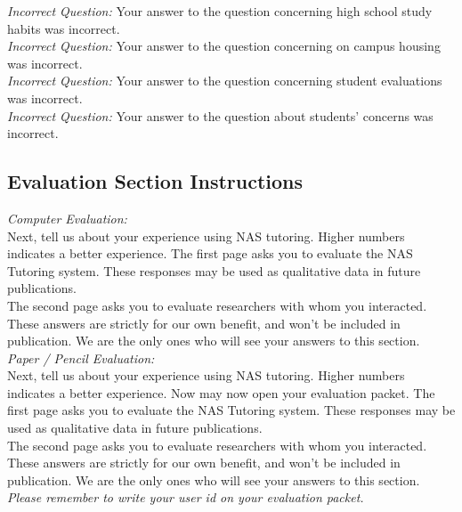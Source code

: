 \documentclass{sig-alternate-05-2015}
\begin{document}
{\noindent \emph{Incorrect Question:} Your answer to the question concerning high school study habits was incorrect.\\

\noindent \emph{Incorrect Question:} Your answer to the question concerning on campus housing was incorrect.\\

\noindent \emph{Incorrect Question:} Your answer to the question concerning student evaluations was incorrect.\\

\noindent \emph{Incorrect Question:} Your answer to the question about students' concerns was incorrect.\\


\subsection{Evaluation Section Instructions}

\noindent \emph{Computer Evaluation:}\\
\noindent Next, tell us about your experience using NAS tutoring. Higher numbers indicates a better experience. The first page asks you to evaluate the NAS Tutoring system. These responses may be used as qualitative data in future publications.\\

\noindent The second page asks you to evaluate researchers with whom you interacted. These answers are strictly for our own benefit, and won't be included in publication. We are the only ones who will see your answers to this section.\\

\noindent \emph{Paper / Pencil Evaluation:}\\
\noindent Next, tell us about your experience using NAS tutoring. Higher numbers indicates a better experience. Now may now open your evaluation packet. The first page asks you to evaluate the NAS Tutoring system. These responses may be used as qualitative data in future publications.\\

\noindent The second page asks you to evaluate researchers with whom you interacted. These answers are strictly for our own benefit, and won't be included in publication. We are the only ones who will see your answers to this section. \emph{Please remember to write your user id on your evaluation packet.}\\

\newpage
}
\end{document}
